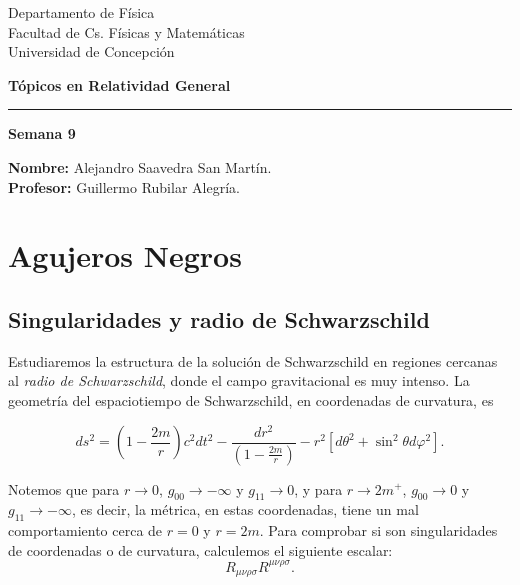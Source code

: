 \documentclass[letterpaper,11pt]{article}
\begin{document}
\pagestyle{plain}

\begin{flushleft}\vspace{-2cm}
Departamento de Física \\
Facultad de Cs. Físicas y Matemáticas\\
Universidad de Concepción
\end{flushleft}

\begin{flushright}\vspace{-1.5cm}
\textbf{Tópicos en Relatividad General} 
\end{flushright}



\rule{\linewidth}{0.1mm}

\begin{center}
\textbf{\LARGE Semana 9}
\end{center}

\begin{flushleft}
\textbf{Nombre:} Alejandro Saavedra San Martín. \\
\textbf{Profesor:} Guillermo Rubilar Alegría.
\end{flushleft}

\section*{Agujeros Negros}

\subsection*{Singularidades y radio de Schwarzschild}

Estudiaremos la estructura de la solución de Schwarzschild en regiones cercanas al \textit{radio de Schwarzschild}, donde el campo gravitacional es muy intenso. La geometría del espaciotiempo de Schwarzschild, en coordenadas de curvatura, es
\begin{shaded}
\begin{equation} \label{eq:Scwarzschild-metric}
    ds^2 = \left( 1 - \frac{2m}{r}\right) c^2 dt^2 - \frac{dr^2}{\left( 1- \frac{2m}{r} \right)} - r^2 \left[ d\theta^2 + \sin^2 \theta d\varphi^2 \right].
\end{equation}
    
\end{shaded}

Notemos que para $r \to 0$, $g_{00} \to - \infty$ y $g_{11} \to 0$, y para $r \to 2m^{+}$, $g_{00} \to 0$ y $g_{11} \to -\infty$, es decir, la métrica, en estas coordenadas, tiene un mal comportamiento cerca de $r = 0$ y $r = 2m$. Para comprobar si son singularidades de coordenadas o de curvatura, calculemos el siguiente escalar:
\begin{equation}
R_{\mu\nu\rho\sigma} R^{\mu\nu\rho\sigma}. 
\end{equation} 
\end{document}
